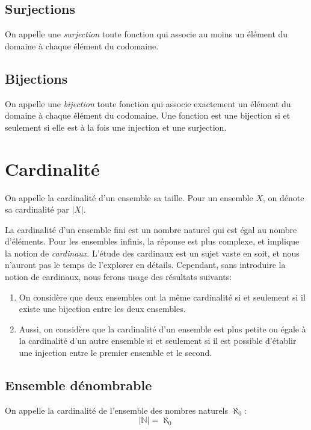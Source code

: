 \subsection{Surjections}

On appelle une \og \textit{surjection} \fg{} toute fonction qui associe au moins un élément du domaine à chaque élément du codomaine.

\subsection{Bijections}

On appelle une \og \textit{bijection} \fg{} toute fonction qui associe exactement un élément du domaine à chaque élément du codomaine.
Une fonction est une bijection si et seulement si elle est à la fois une injection et une surjection.

\section{Cardinalité}

On appelle la cardinalité d'un ensemble sa taille. Pour un ensemble $X$, on dénote sa cardinalité par $|X|$.

La cardinalité d'un ensemble fini est un nombre naturel qui est égal au nombre d'éléments.
Pour les ensembles infinis, la réponse est plus complexe, et implique la notion de \textit{cardinaux}.
L'étude des cardinaux est un sujet vaste en soit, et nous n'auront pas le temps de l'explorer en détails.
Cependant, sans introduire la notion de cardinaux, nous ferons usage des résultats suivants:
\begin{enumerate}
\item
On considère que deux ensembles ont la même cardinalité si et seulement si il existe une bijection entre les deux ensembles.
\item
Aussi, on considère que la cardinalité d'un ensemble est plus petite ou égale à la cardinalité d'un autre ensemble si et seulement si il est possible d'établir une injection entre le premier ensemble et le second.
\end{enumerate}

\subsection{Ensemble dénombrable}

On appelle la cardinalité de l'ensemble des nombres naturels $\aleph_0$:
\[
|\mathbb{N}| = \aleph_0
\]

